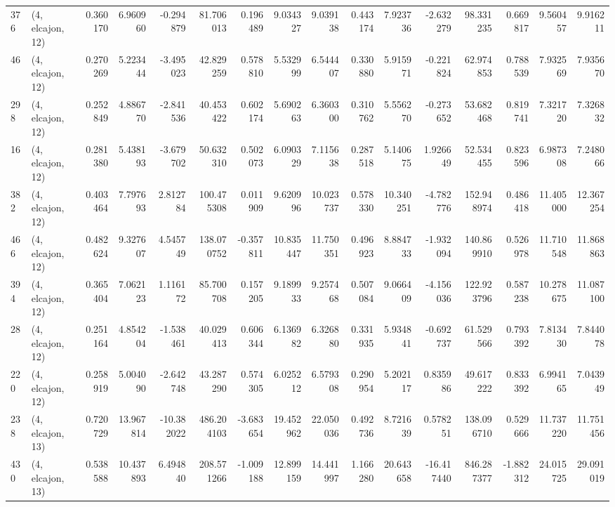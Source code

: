 \begin{tabular}{llrrrrrrrrrrrrrr}
376 &  (4, elcajon, 12) &   0.360170 &   6.960960 &  -0.294879 &    81.706013 &   0.196489 &   9.034327 &   9.039138 &  0.443174 &   7.923736 &  -2.632279 &    98.331235 &  0.669817 &   9.560457 &   9.916211 \\
46  &  (4, elcajon, 12) &   0.270269 &   5.223444 &  -3.495023 &    42.829259 &   0.578810 &   5.532999 &   6.544407 &  0.330880 &   5.915971 &  -0.221824 &    62.974853 &  0.788539 &   7.932569 &   7.935670 \\
298 &  (4, elcajon, 12) &   0.252849 &   4.886770 &  -2.841536 &    40.453422 &   0.602174 &   5.690263 &   6.360300 &  0.310762 &   5.556270 &  -0.273652 &    53.682468 &  0.819741 &   7.321720 &   7.326832 \\
16  &  (4, elcajon, 12) &   0.281380 &   5.438193 &  -3.679702 &    50.632310 &   0.502073 &   6.090329 &   7.115638 &  0.287518 &   5.140675 &   1.926649 &    52.534455 &  0.823596 &   6.987308 &   7.248066 \\
382 &  (4, elcajon, 12) &   0.403464 &   7.797693 &   2.812784 &   100.475308 &   0.011909 &   9.620996 &  10.023737 &  0.578330 &  10.340251 &  -4.782776 &   152.948974 &  0.486418 &  11.405000 &  12.367254 \\
466 &  (4, elcajon, 12) &   0.482624 &   9.327607 &   4.545749 &   138.070752 &  -0.357811 &  10.835447 &  11.750351 &  0.496923 &   8.884733 &  -1.932094 &   140.869910 &  0.526978 &  11.710548 &  11.868863 \\
394 &  (4, elcajon, 12) &   0.365404 &   7.062123 &   1.116172 &    85.700708 &   0.157205 &   9.189933 &   9.257468 &  0.507084 &   9.066409 &  -4.156036 &   122.923796 &  0.587238 &  10.278675 &  11.087100 \\
28  &  (4, elcajon, 12) &   0.251164 &   4.854204 &  -1.538461 &    40.029413 &   0.606344 &   6.136982 &   6.326880 &  0.331935 &   5.934841 &  -0.692737 &    61.529566 &  0.793392 &   7.813430 &   7.844078 \\
220 &  (4, elcajon, 12) &   0.258919 &   5.004090 &  -2.642748 &    43.287290 &   0.574305 &   6.025212 &   6.579308 &  0.290954 &   5.202117 &   0.835986 &    49.617222 &  0.833392 &   6.994165 &   7.043949 \\
238 &  (4, elcajon, 13) &   0.720729 &  13.967814 & -10.382022 &   486.204103 &  -3.683654 &  19.452962 &  22.050036 &  0.492736 &   8.721639 &   0.578251 &   138.096710 &  0.529666 &  11.737220 &  11.751456 \\
430 &  (4, elcajon, 13) &   0.538588 &  10.437893 &   6.494840 &   208.571266 &  -1.009188 &  12.899159 &  14.441997 &  1.166280 &  20.643658 & -16.417440 &   846.287377 & -1.882312 &  24.015725 &  29.091019 \\

\end{tabular}
